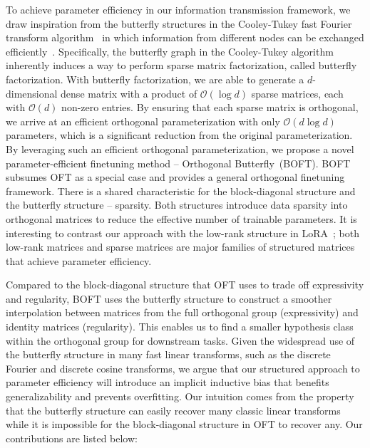 \documentclass{article} %
\begin{document}
\vspace{-0.6mm}

To achieve parameter efficiency in our information transmission framework, we draw inspiration from the butterfly structures in the Cooley-Tukey fast Fourier transform algorithm~\cite{cooley1965algorithm} in which information from different nodes can be exchanged efficiently~\cite{klasing1994broadcasting}. Specifically, the butterfly graph in the Cooley-Tukey algorithm inherently induces a way to perform sparse matrix factorization, called butterfly factorization. With butterfly factorization, we are able to generate a $d$-dimensional dense matrix with a product of $\mathcal{O}(\log d)$ sparse matrices, each with $\mathcal{O}(d)$ non-zero entries. By ensuring that each sparse matrix is orthogonal, we arrive at an efficient orthogonal parameterization with only $\mathcal{O}(d\log d)$  parameters, which is a significant reduction from the original parameterization. By leveraging such an efficient orthogonal parameterization, we propose a novel parameter-efficient finetuning method -- Orthogonal Butterfly~(BOFT). BOFT subsumes OFT as a special case and provides a general orthogonal finetuning framework. There is a shared characteristic for the block-diagonal structure and the butterfly structure -- sparsity. Both structures introduce data sparsity into orthogonal matrices to reduce the effective number of trainable parameters.  It is interesting to   contrast our approach with the low-rank structure in LoRA~\cite{hulora2022};  both low-rank matrices and sparse matrices are major families of structured matrices~\cite{candes2011robust} that achieve parameter efficiency. %

\vspace{-0.6mm}

Compared to the block-diagonal structure that OFT uses to trade off expressivity and regularity, BOFT uses the butterfly structure to construct a smoother interpolation between matrices from the full orthogonal group (expressivity) and identity matrices (regularity). This enables us to find a smaller hypothesis class within the orthogonal group for downstream tasks. 
Given the widespread use of the butterfly structure in many fast linear transforms, such as the discrete Fourier and discrete cosine transforms, we argue that our structured approach to parameter efficiency will introduce an implicit inductive bias that benefits generalizability and prevents overfitting. Our intuition comes from the property that the butterfly structure can easily recover many classic linear transforms while it is impossible for the block-diagonal structure in OFT to recover any. Our contributions are listed below:
\end{document}
